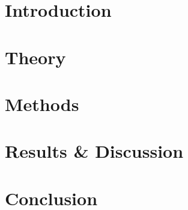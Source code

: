\documentclass[12pt]{report}
\begin{document}
    \begin{spacing}{1.2}
	\tableofcontents
	\listoffigures
	\end{spacing}
	
	
	\chapter{Introduction}
	
	\chapter{Theory}
	
	\chapter{Methods}
	
	\chapter{Results \& Discussion}
	
	\chapter{Conclusion}
	


\newpage



\end{document}
